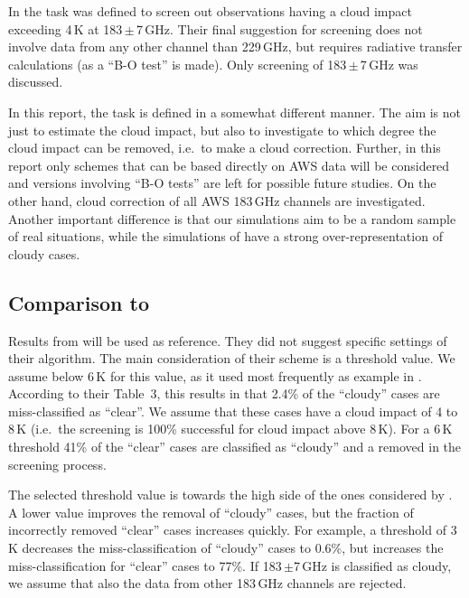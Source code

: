 \documentclass[12pt]{article}
\begin{document}
In \citet{rekha2012potential} the task was defined to screen out observations
having a cloud impact exceeding 4\,K at 183\,$\pm$\,7\,GHz. Their final suggestion
for screening does not involve data from any other channel than 229\,GHz, but
requires radiative transfer calculations (as a ``B-O test'' is made). Only 
screening of 183\,$\pm$\,7\,GHz was discussed.

In this report, the task is defined in a somewhat different manner. The aim is
not just to estimate the cloud impact, but also to investigate to which degree
the cloud impact can be removed, i.e.\ to make a cloud correction. Further, in
this report only schemes that can be based directly on AWS data will be
considered and versions involving ``B-O tests'' are left for possible future
studies. On the other hand, cloud correction of all AWS 183\,GHz channels are
investigated. Another important difference is that our simulations aim to be a
random sample of real situations, while the simulations of
\citet{rekha2012potential} have a strong over-representation of cloudy
cases.



\subsection{Comparison to \citet{rekha2012potential}}
\label{sec:rekha}
%
Results from \citet{rekha2012potential} will be used as reference. They did not
suggest specific settings of their algorithm. The main consideration of their
scheme is a threshold value. We assume below 6\,K for
this value, as it used most frequently as example in
\citet{rekha2012potential}. According to their Table~3, this results in that
2.4\% of the ``cloudy'' cases are miss-classified as ``clear''. We assume that
these cases have a cloud impact of 4 to 8\,K (i.e.\ the screening is 100\%
successful for cloud impact above 8\,K). For a 6\,K threshold 41\% of the
``clear'' cases are classified as ``cloudy'' and a removed in the screening
process. 

The selected threshold value is towards the high side of the ones considered by 
\citet{rekha2012potential}. A lower value improves the removal of ``cloudy'' cases,
but the fraction of incorrectly removed ``clear'' cases increases quickly. For
example, a threshold of 3\,K decreases the miss-classification of ``cloudy''
cases to 0.6\%, but increases the miss-classification for ``clear'' cases to 77\%.
If 183\,$\pm$7\,GHz is classified as cloudy, we assume that also the data from
other 183\,GHz channels are rejected.
\end{document}
